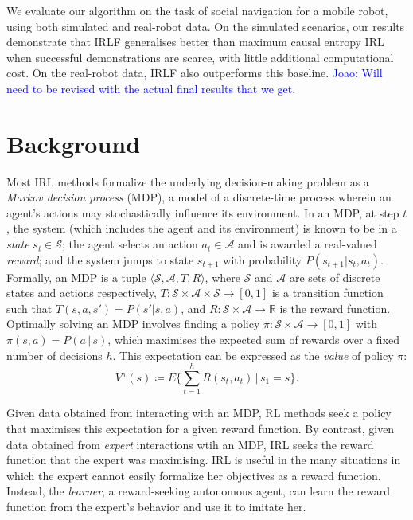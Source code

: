 \documentclass[letterpaper]{article}
\newcommand{\jm}[1]{\textcolor{blue}{Joao: #1}}
\newcommand{\jm}[1]{}
\begin{document}
We evaluate our algorithm on the task of social navigation for a mobile robot, using both simulated and real-robot data. On the simulated scenarios, our results demonstrate that IRLF generalises better than maximum causal entropy IRL when successful demonstrations are scarce, with little additional computational cost.  On the real-robot data, IRLF also outperforms this baseline. \jm{Will need to be revised with the actual final results that we get}.



\section{Background}
Most IRL methods formalize the underlying decision-making problem as a \emph{Markov decision process} (MDP), a model of a discrete-time process wherein an agent's actions may stochastically influence its environment. In an MDP, at step $t$, the system (which includes the agent and its environment) is known to be in a \emph{state} $s_t\in\mathcal{S}$; the agent selects an action $a_t\in\mathcal{A}$ and is awarded a real-valued \emph{reward}; and the system jumps to state $s_{t+1}$ with probability $P(s_{t+1}|s_t,a_t)$. Formally, an MDP is a tuple $\langle\mathcal{S},\mathcal{A},T,R\rangle$, where $\mathcal{S}$ and $\mathcal{A}$ are sets of discrete states and actions respectively, $T:\mathcal{S}\times\mathcal{A}\times\mathcal{S}\rightarrow [0,1]$ is a transition function such that $T(s,a,s')=P(s'|s,a)$, and $R:\mathcal{S}\times\mathcal{A}\rightarrow\mathbb R$ is the reward function. 
Optimally solving an MDP involves finding a policy $\pi:\mathcal{S}\times\mathcal{A}\rightarrow[0,1]$ with $\pi(s,a) = P(a\,|\,s)$, which maximises the expected sum of rewards over a fixed number of decisions $h$. This expectation can be expressed as the \emph{value} of policy $\pi$:
\begin{equation}
\label{eq:value}
 V^\pi(s) \coloneqq E\{\sum_{t = 1}^hR(s_t,a_t)\,\vert\, s_1 = s\}.
\end{equation}

Given data obtained from interacting with an MDP, RL methods seek a policy that maximises this expectation for a given reward function.  By contrast, given data obtained from \emph{expert} interactions wtih an MDP, IRL seeks the reward function that the expert was maximising.  IRL is useful in the many situations in which the expert cannot easily formalize her objectives as a reward function.  Instead, the \emph{learner}, a reward-seeking autonomous agent, can learn the reward function from the expert's behavior and use it to imitate her.
\end{document}

